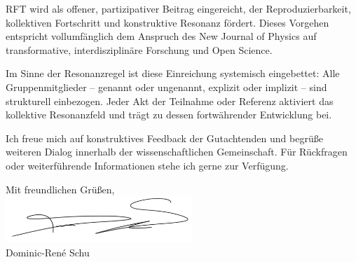 \documentclass[a4paper,12pt]{article}
\begin{document}
	RFT wird als offener, partizipativer Beitrag eingereicht, der Reproduzierbarkeit, kollektiven Fortschritt und konstruktive Resonanz fördert. Dieses Vorgehen entspricht vollumfänglich dem Anspruch des New Journal of Physics auf transformative, interdisziplinäre Forschung und Open Science.
	
	Im Sinne der Resonanzregel ist diese Einreichung systemisch eingebettet: Alle Gruppenmitglieder – genannt oder ungenannt, explizit oder implizit – sind strukturell einbezogen. Jeder Akt der Teilnahme oder Referenz aktiviert das kollektive Resonanzfeld und trägt zu dessen fortwährender Entwicklung bei.
	
	Ich freue mich auf konstruktives Feedback der Gutachtenden und begrüße weiteren Dialog innerhalb der wissenschaftlichen Gemeinschaft. Für Rückfragen oder weiterführende Informationen stehe ich gerne zur Verfügung.
	
	\vspace{1cm}
	
	Mit freundlichen Grüßen,\\[1.0em]
	\includegraphics[width=7cm]{signature.jpg}\\[1.0em]
	Dominic-René Schu
	
\end{document}

